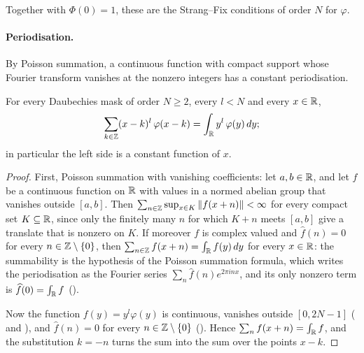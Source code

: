 Together with $\Phi(0) = 1$, these are the Strang--Fix conditions of order $N$ for $\varphi$.

\paragraph{Periodisation.}
By Poisson summation, a continuous function with compact support whose Fourier transform
vanishes at the nonzero integers has a constant periodisation.

\begin{proposition}
\label{prop:daub-periodised-moments}
\leanok
{}
For every Daubechies mask of order $N \geq 2$, every $l < N$ and every $x \in \mathbb{R}$,
\[
  \sum_{k \in \mathbb{Z}} (x - k)^l \, \varphi(x - k) = \int_{\mathbb{R}} y^l \, \varphi(y) \, dy ;
\]
in particular the left side is a constant function of $x$.
\end{proposition}

\begin{proof}
\leanok
{}
First, Poisson summation with vanishing coefficients: let $a, b \in \mathbb{R}$, and let $f$ be a
continuous function on $\mathbb{R}$ with values in a normed abelian group that vanishes outside
$[a, b]$. Then $\sum_{n \in \mathbb{Z}} \sup_{x \in K} \|f(x + n)\| < \infty$ for every compact set
$K \subseteq \mathbb{R}$, since only the finitely many $n$ for which $K + n$ meets $[a, b]$ give a
translate that is nonzero on $K$. If moreover $f$ is complex valued and $\widehat f(n) = 0$ for
every $n \in \mathbb{Z} \setminus \{0\}$, then $\sum_{n \in \mathbb{Z}} f(x + n) = \int_{\mathbb{R}} f(y) \, dy$ for every
$x \in \mathbb{R}$: the summability is the hypothesis of the Poisson summation formula, which writes
the periodisation as the Fourier series $\sum_n \widehat f(n) e^{2\pi i n x}$, and its only
nonzero term is $\widehat f(0) = \int_{\mathbb{R}} f$ ().

Now the function $f(y) = y^l \varphi(y)$ is continuous, vanishes outside $[0, 2N - 1]$
( and ), and $\widehat f(n) = 0$
for every $n \in \mathbb{Z} \setminus \{0\}$ (). Hence
$\sum_n f(x + n) = \int_{\mathbb{R}} f$, and the substitution $k = -n$ turns the sum into the sum over
the points $x - k$.
\end{proof}

